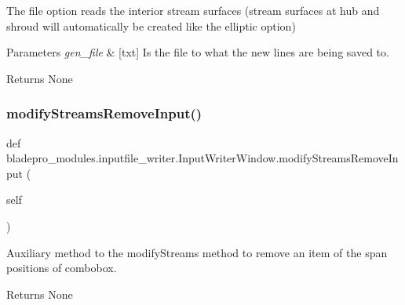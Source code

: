 The file option reads the interior stream surfaces (stream surfaces at hub and shroud will automatically be created like the elliptic option)


\begin{DoxyParams}{Parameters}
{\em gen\+\_\+file} & \mbox{[}txt\mbox{]} Is the file to what the new lines are being saved to. \\
\hline
\end{DoxyParams}
\begin{DoxyReturn}{Returns}
None 
\end{DoxyReturn}
\hypertarget{a00071_ade4195a752861e46586e7b163136620f}{}\label{a00071_ade4195a752861e46586e7b163136620f} 
\subsubsection{\texorpdfstring{modify\+Streams\+Remove\+Input()}{modifyStreamsRemoveInput()}}
{\footnotesize\ttfamily def bladepro\+\_\+modules.\+inputfile\+\_\+writer.\+Input\+Writer\+Window.\+modify\+Streams\+Remove\+Input (\begin{DoxyParamCaption}\item[{}]{self }\end{DoxyParamCaption})}



Auxiliary method to the modify\+Streams method to remove an item of the span positions of combobox. 

\begin{DoxyReturn}{Returns}
None 
\end{DoxyReturn}
\hypertarget{a00071_af60dda179dc289691a59b52cb8ed3e70}{}\label{a00071_af60dda179dc289691a59b52cb8ed3e70} 
